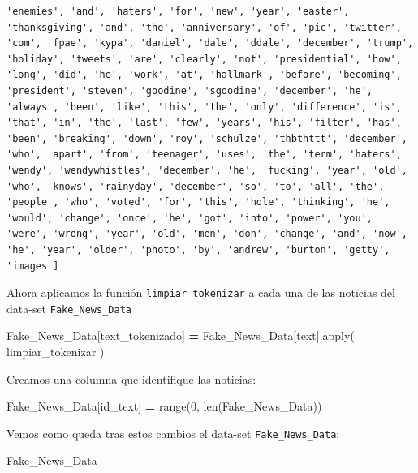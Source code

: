 \documentclass[
  11pt,
  a4paper,
]{article}
\newenvironment{Shaded}{\begin{snugshade}}{\end{snugshade}}
\newcommand{\BuiltInTok}[1]{#1}
\newcommand{\DecValTok}[1]{\textcolor[rgb]{0.00,0.00,0.81}{#1}}
\newcommand{\NormalTok}[1]{#1}
\newcommand{\OperatorTok}[1]{\textcolor[rgb]{0.81,0.36,0.00}{\textbf{#1}}}
\newcommand{\StringTok}[1]{\textcolor[rgb]{0.31,0.60,0.02}{#1}}
\begin{document}
\begin{verbatim}
'enemies', 'and', 'haters', 'for', 'new', 'year', 'easter', 'thanksgiving', 'and', 'the', 'anniversary', 'of', 'pic', 'twitter', 'com', 'fpae', 'kypa', 'daniel', 'dale', 'ddale', 'december', 'trump', 'holiday', 'tweets', 'are', 'clearly', 'not', 'presidential', 'how', 'long', 'did', 'he', 'work', 'at', 'hallmark', 'before', 'becoming', 'president', 'steven', 'goodine', 'sgoodine', 'december', 'he', 'always', 'been', 'like', 'this', 'the', 'only', 'difference', 'is', 'that', 'in', 'the', 'last', 'few', 'years', 'his', 'filter', 'has', 'been', 'breaking', 'down', 'roy', 'schulze', 'thbthttt', 'december', 'who', 'apart', 'from', 'teenager', 'uses', 'the', 'term', 'haters', 'wendy', 'wendywhistles', 'december', 'he', 'fucking', 'year', 'old', 'who', 'knows', 'rainyday', 'december', 'so', 'to', 'all', 'the', 'people', 'who', 'voted', 'for', 'this', 'hole', 'thinking', 'he', 'would', 'change', 'once', 'he', 'got', 'into', 'power', 'you', 'were', 'wrong', 'year', 'old', 'men', 'don', 'change', 'and', 'now', 'he', 'year', 'older', 'photo', 'by', 'andrew', 'burton', 'getty', 'images']
\end{verbatim}

Ahora aplicamos la función \texttt{limpiar\_tokenizar} a cada una de las
noticias del data-set \texttt{Fake\_News\_Data}

\begin{Shaded}
\begin{Highlighting}[]
\NormalTok{Fake\_News\_Data[}\StringTok{\textquotesingle{}text\_tokenizado\textquotesingle{}}\NormalTok{] }\OperatorTok{=}\NormalTok{ Fake\_News\_Data[}\StringTok{\textquotesingle{}text\textquotesingle{}}\NormalTok{].}\BuiltInTok{apply}\NormalTok{( limpiar\_tokenizar )}
\end{Highlighting}
\end{Shaded}

Creamos una columna que identifique las noticias:

\begin{Shaded}
\begin{Highlighting}[]
\NormalTok{Fake\_News\_Data[}\StringTok{\textquotesingle{}id\_text\textquotesingle{}}\NormalTok{] }\OperatorTok{=} \BuiltInTok{range}\NormalTok{(}\DecValTok{0}\NormalTok{, }\BuiltInTok{len}\NormalTok{(Fake\_News\_Data))}
\end{Highlighting}
\end{Shaded}

Vemos como queda tras estos cambios el data-set
\texttt{Fake\_News\_Data}:

\begin{Shaded}
\begin{Highlighting}[]
\NormalTok{Fake\_News\_Data}
\end{Highlighting}
\end{Shaded}
\end{document}
